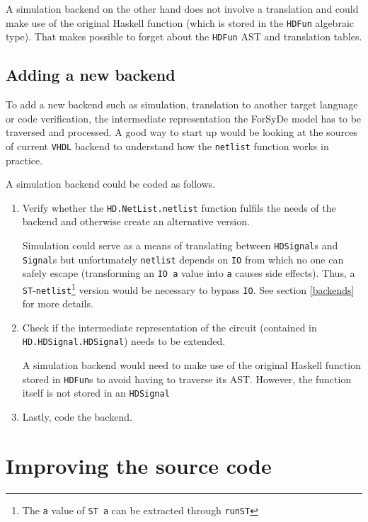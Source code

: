 A simulation backend on the other hand does not involve a translation
and could make use of the original Haskell function (which is stored
in the \texttt{HDFun} algebraic type). That makes possible to forget
about the \texttt{HDFun} AST and translation tables.

\subsection{Adding a new backend}

To add a new backend such as simulation, translation to another target
language or code verification, the intermediate representation the ForSyDe
model has to be traversed and processed. A good way to start up would be
looking at the sources of current \texttt{VHDL} backend to understand how the
\texttt{netlist} function works in practice.

A simulation backend could be coded as follows.

\begin{enumerate}[1)]
\item Verify whether the \texttt{HD.NetList.netlist} function fulfils
  the needs of the backend and otherwise create an alternative version.

  Simulation could serve as a means of translating between
  \texttt{HDSignal}s and \texttt{Signal}s but unfortunately
  \texttt{netlist} depends on \texttt{IO} from which no one can safely
  escape (transforming an \texttt{IO a} value into \texttt{a} 
  causes side effects). Thus, a
  \texttt{ST}-\texttt{netlist}\footnote{The \texttt{a} value of
    \texttt{ST a} can be extracted through \texttt{runST}} version
  would be necessary to bypass \texttt{IO}.  See section
  \ref{backends} for more details.

\item Check if the intermediate representation of the circuit
  (contained in \texttt{\texttt{HD.\-HDSignal.\-HDSignal}}) needs to
  be extended.
  
  A simulation backend would need to make use of the original Haskell
  function stored in \texttt{HDFun}s to avoid having to traverse its
  AST. However, the function itself is not stored in an \texttt{HDSignal}

\item Lastly, code the backend.
\end{enumerate}

\section{Improving the source code}


